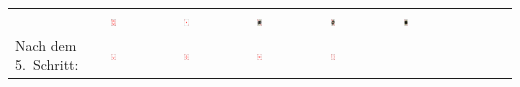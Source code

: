 \begin{tabular}{m{30mm}m{11mm}m{11mm}m{11mm}m{11mm}m{11mm}m{11mm}m{11mm}m{11mm}}
&
\includegraphics[width=0.08\textwidth]{./inf/SEKII/19_Java_Sortierverfahren/Karo10.png}
&
\includegraphics[width=0.08\textwidth]{./inf/SEKII/19_Java_Sortierverfahren/KaroAs.png}
&
\includegraphics[width=0.08\textwidth]{./inf/SEKII/19_Java_Sortierverfahren/KaroKoenig.png}
&
\includegraphics[width=0.08\textwidth]{./inf/SEKII/19_Java_Sortierverfahren/KaroDame.png}
&
\includegraphics[width=0.08\textwidth]{./inf/SEKII/19_Java_Sortierverfahren/KaroBube.png}
\\
Nach dem 5.\ Schritt: &
\includegraphics[width=0.08\textwidth]{./inf/SEKII/19_Java_Sortierverfahren/Karo7.png}
&
\includegraphics[width=0.08\textwidth]{./inf/SEKII/19_Java_Sortierverfahren/Karo8.png}
&
\includegraphics[width=0.08\textwidth]{./inf/SEKII/19_Java_Sortierverfahren/Karo9.png}
&
\includegraphics[width=0.08\textwidth]{./inf/SEKII/19_Java_Sortierverfahren/Karo10.png}

\end{tabular}
